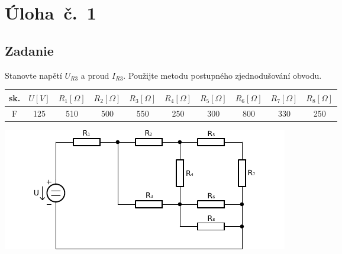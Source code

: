 \section{Úloha~č.~1}
\subsection{Zadanie}
Stanovte napětí $U_{R3}$ a proud $I_{R3}$. Použijte metodu postupného zjednodušování obvodu.
\begin{table}[H]
\begin{center}
  \begin{tabular}{|c|c|c|c|c|c|c|c|c|c|}
    \hline
    sk. & $U [V]$ & $R_{1} [\Omega]$ & $R_{2} [\Omega]$ 
    &  $R_{3} [\Omega]$ &  $R_{4} [\Omega]$ &  $R_{5} [\Omega]$
    &  $R_{6} [\Omega]$ &  $R_{7} [\Omega]$ &  $R_{8} [\Omega]$ \\ 
    \hline
    F & 125 & 510 & 500 & 550 & 250 & 300 & 800 & 330 & 250 \\ 
    \hline
  \end{tabular}
\end{center}
\end{table}
\begin{center}
  \includegraphics[width=0.8\columnwidth,keepaspectratio]{res/u1o1}
\end{center}
